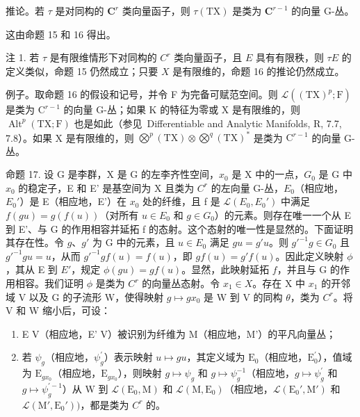 推论。若 \(\tau\) 是对同构的 \(\mathbf{C}^r\) 类向量函子，则 \(\tau(\mathrm{TX})\) 是类为 \(\mathbf{C}^{r-1}\) 的向量 G-丛。

这由命题 15 和 16 得出。

注 1. 若 \(\tau\) 是有限维情形下对同构的 \(C^r\) 类向量函子，且 \(E\) 具有有限秩，则 \(\tau E\) 的定义类似，命题 15 仍然成立；只要 \(X\) 是有限维的，命题 16 的推论仍然成立。

例子。取命题 16 的假设和记号，并令 F 为完备可赋范空间。则 \(\mathcal{L}((\mathrm{TX})^p; \mathrm{F})\) 是类为 \(\mathrm{C}^{r-1}\) 的向量 G-丛；如果 K 的特征为零或 X 是有限维的，则 \(\operatorname{Alt}^p(\mathrm{TX}; \mathrm{F})\) 也是如此（参见~Differentiable and Analytic Manifolds, R, 7.7, 7.8）。如果 X 是有限维的，则 \(\bigotimes^p(\mathrm{TX}) \otimes \bigotimes^q(\mathrm{TX})^*\) 是类为 \(\mathrm{C}^{r-1}\) 的向量 G-丛。

命题 17. 设 G 是李群，X 是 G 的左李齐性空间，\(x_0\) 是 X 中的一点，\(G_0\) 是 G 中 \(x_0\) 的稳定子，E 和 E' 是基空间为 X 且类为 \(C^{r}\) 的左向量 G-丛，\(E_0\)（相应地，\(E_0'\)）是 E（相应地，E'）在 \(x_0\) 处的纤维，且 f 是 \(\mathcal{L}(E_0, E_0')\) 中满足 \(f(gu) = g(f(u))\)（对所有 \(u \in E_0\) 和 \(g \in G_0\)）的元素。则存在唯一一个从 E 到 E'、与 G 的作用相容并延拓 f 的态射。这个态射的唯一性是显然的。下面证明其存在性。令 \(g\)、\(g'\) 为 G 中的元素，且 \(u \in E_0\) 满足 \(gu = g'u\)。则 \(g'^{-1}g \in G_0\) 且 \(g'^{-1}gu = u\)，从而 \(g'^{-1}gf(u) = f(u)\)，即 \(gf(u) = g'f(u)\)。因此定义映射 \(\phi\)，其从 E 到 \(E'\)，规定 \(\phi(gu) = gf(u)\)。显然，此映射延拓 \(f\)，并且与 G 的作用相容。我们证明 \(\phi\) 是类为 \(C^r\) 的向量丛态射。令 \(x_1 \in X\)。存在 X 中 \(x_1\) 的开邻域 V 以及 G 的子流形 W，使得映射 \(g \mapsto gx_0\) 是 W 到 V 的同构 \(\theta\)，类为 \(C^r\)。将 V 和 W 缩小后，可设：

\begin{enumerate}
\def\labelenumi{(\arabic{enumi})}
\item
  E \textbar{} V（相应地，E' \textbar{} V）被识别为纤维为 M（相应地，M'）的平凡向量丛；
\item
  若 \(\psi_{g}\)（相应地，\(\psi_{g}^{\prime}\)）表示映射 \(u\mapsto gu\)，其定义域为 \(\mathrm{E}_0\)（相应地，\(\mathrm{E}_0^{\prime}\)），值域为 \(\mathrm{E}_{gx_0}\)（相应地，\(\mathrm{E}_{gx_0}\)），则映射 \(g\mapsto \psi_g\) 和 \(g\mapsto \psi_g^{-1}\)（相应地，\(g\mapsto \psi_g^{\prime}\) 和 \(g\mapsto \psi_g^{\prime -1}\)）从 W 到 \(\mathcal{L}(\mathrm{E}_0,\mathrm{M})\) 和 \(\mathcal{L}(\mathrm{M},\mathrm{E}_0)\)（相应地，\(\mathcal{L}(\mathrm{E}_0',\mathrm{M}')\) 和 \(\mathcal{L}(\mathrm{M}',\mathrm{E}_0'))\)，都是类为 \(C^r\) 的。
\end{enumerate}

